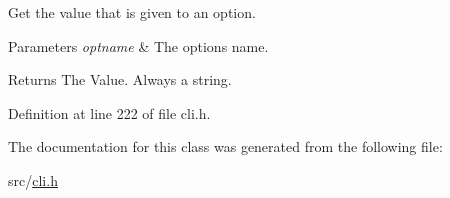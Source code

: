 Get the value that is given to an option. 


\begin{DoxyParams}{Parameters}
{\em optname} & The option\textquotesingle{}s name. \\
\hline
\end{DoxyParams}
\begin{DoxyReturn}{Returns}
The Value. Always a string. 
\end{DoxyReturn}


Definition at line 222 of file cli.\+h.



The documentation for this class was generated from the following file\+:\begin{DoxyCompactItemize}
\item 
src/\hyperlink{cli_8h}{cli.\+h}\end{DoxyCompactItemize}
